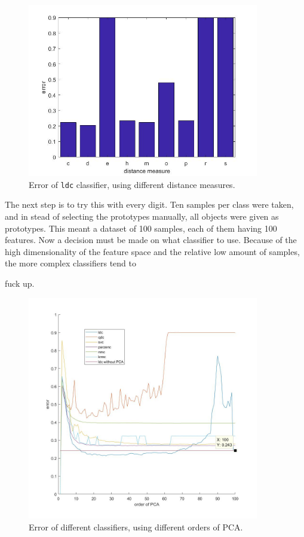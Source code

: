 \begin{figure}[H]
	\centering
	\includegraphics[width = 0.9\textwidth]{images/dissim_bar_dist.jpg}
	\caption{Error of \texttt{ldc} classifier, using different distance measures.}
	\label{fig:dissim_bar_dist}
\end{figure}

\noindent The next step is to try this with every digit. Ten samples per class were taken, and in stead of selecting the prototypes manually, all objects were given as prototypes. This meant a dataset of 100 samples, each of them having 100 features. Now a decision must be made on what classifier to use. Because of the high dimensionality of the feature space and the relative low amount of samples, the more complex classifiers tend to 

fuck up.

\begin{figure}[H]
	\centering
	\includegraphics[width = 0.9\textwidth]{images/dissim_all_class.jpg}
	\caption{Error of different classifiers, using different orders of PCA.}
	\label{fig:dissim_all_class}
\end{figure}

